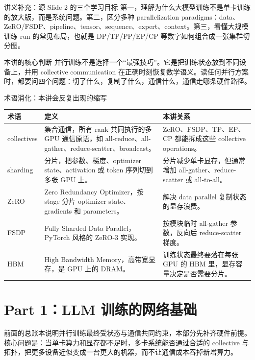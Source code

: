 \documentclass[a4paper]{article}
\begin{document}
\begin{knowledgebox}{讲义补充：源 Slide 2 的三个学习目标}
第一，理解为什么大模型训练不是单卡训练的放大版，而是系统问题。第二，区分多种 parallelization paradigms：data、ZeRO/FSDP、pipeline、tensor、sequence、expert、context。第三，看懂大规模训练 run 的常见布局，也就是 DP/TP/PP/EP/CP 等数字如何组合成一张集群切分图。
\end{knowledgebox}


\begin{importantbox}{本讲的核心判断}
并行训练不是选择一个“最强技巧”。它是把训练状态放到不同设备上，并用 collective communication 在正确时刻恢复数学语义。读任何并行方案时，都要问四个问题：切了什么，复制了什么，通信什么，通信走哪条硬件路径。
\end{importantbox}

\begin{knowledgebox}{术语消化：本讲会反复出现的缩写}
\begin{tabular}{L{0.15\textwidth}L{0.33\textwidth}L{0.38\textwidth}}
\toprule
术语 & 定义 & 本讲关系 \\
\midrule
collectives & 集合通信，所有 rank 共同执行的多 GPU 通信原语，如 all-reduce、all-gather、reduce-scatter、broadcast。 & ZeRO、FSDP、TP、EP、CP 都能拆成这些 collective operations。 \\
sharding & 分片，把参数、梯度、optimizer state、activation 或 token 序列切到多张 GPU 上。 & 分片减少单卡显存，但通常增加 all-gather、reduce-scatter 或 all-to-all。 \\
ZeRO & Zero Redundancy Optimizer，按 stage 分片 optimizer state、gradients 和 parameters。 & 解决 data parallel 复制状态的显存浪费。 \\
FSDP & Fully Sharded Data Parallel，PyTorch 风格的 ZeRO-3 实现。 & 按模块临时 all-gather 参数，反向后 reduce-scatter 梯度。 \\
HBM & High Bandwidth Memory，高带宽显存，是 GPU 上的 DRAM。 & 训练状态最终要落在每张 GPU 的 HBM 里，显存容量决定是否需要分片。 \\
\bottomrule
\end{tabular}
\end{knowledgebox}

\section{Part 1：LLM 训练的网络基础}

前面的总账本说明并行训练最终受状态与通信共同约束，本部分先补齐硬件前提。核心问题是：当单卡算力和显存都不足时，多卡系统能否通过合适的 collective 与拓扑，把更多设备近似变成一台更大的机器，而不让通信成本吞掉新增算力。
\end{document}

